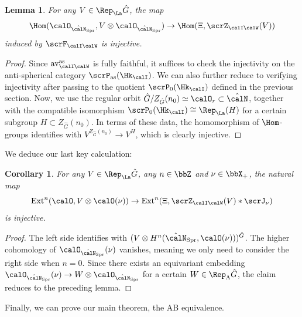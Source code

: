 \documentclass[10pt, reqno]{amsart}
\theoremstyle{plain}
\newtheorem{lemma}[theorem]{Lemma}
\newtheorem{corollary}[theorem]{Corollary}
\theoremstyle{definition}
\numberwithin{equation}{section}
\begin{document}
\begin{lemma}
	For any $V \in \Rep_\La \hat{G}$, the map
	\begin{equation}
		\Hom(\calO_{\hat{\calN}_{\mathrm{Spr}}},V\otimes \calO_{\hat{\calN}_{\mathrm{Spr}}}) \to \Hom(\Xi, \scrZ_{\calI\calW}(V))
	\end{equation}
	induced by $\scrF_{\calI\calW}$ is injective.
\end{lemma}

\begin{proof}
	Since $\mathrm{av}_{\calI\calW}^{\mathrm{as}}$ is fully faithful, it suffices to check the injectivity on the anti-spherical category $\scrP_{\mathrm{as}}(\Hk_{\calI})$. We can also further reduce to verifying injectivity after passing to the quotient $\scrP_0(\Hk_{\calI})$ defined in the previous section. Now, we use the regular orbit $\hat{G}/Z_{\hat{G}}(n_0)\simeq \calO_r \subset \hat{\calN}$, together with the compatible isomorphism $\scrP_0(\Hk_{\calI})\cong \Rep_\La (H)$ for a certain subgroup $H\subset Z_{\hat{G}}(n_0)$. In terms of these data, the homomorphism of $\Hom$-groups identifies with $ V^{Z_{\hat{G}}(n_0)} \to V^H$, which is clearly injective.
\end{proof}

We deduce our last key calculation:
\begin{corollary}
	For any $V \in \Rep_\La \hat{G}$, any $n \in \bbZ$ and $\nu \in \bbX_+$, the natural map
	\begin{equation}\label{eq_FIW_shift_hom}
		\mathrm{Ext}^n(\calO,V\otimes \calO(\nu)) \to \mathrm{Ext}^n(\Xi, \scrZ_{\calI\calW}(V)\ast \scrJ_\nu)
	\end{equation}
	is injective.
\end{corollary}

\begin{proof}
	The left side identifies with $(V\otimes H^n(\hat{\calN}_{\mathrm{Spr}},\calO(\nu)))^{\hat{G}}$. The higher cohomology of $\calO_{\hat{\calN}_{\mathrm{Spr}}}(\nu)$ vanishes, meaning we only need to consider the right side when $n=0$. Since there exists an equivariant embedding $\calO_{\hat{\calN}_{\mathrm{Spr}}}(\nu) \to W\otimes\calO_{\hat{\calN}_{\mathrm{Spr}}}$ for a certain $W\in \Rep_\Lambda \hat{G}$, the claim reduces to the preceding lemma.
\end{proof}

Finally, we can prove our main theorem, the AB equivalence.
\end{document}
